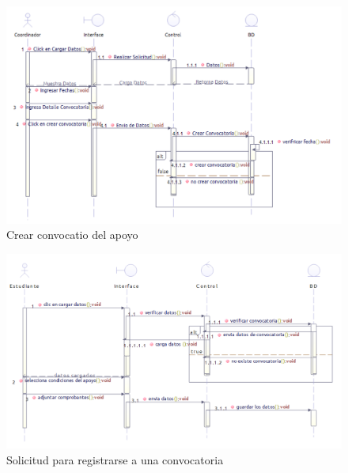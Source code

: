 	\begin{figure}[th!]
	\centering
	\includegraphics[width=1.4\linewidth]{uml/SecCrearConv}
	\caption{Crear convocatio del apoyo}
	\label{fig:Crear convocatio del apoyo}
	\end{figure}
\clearpage
	\begin{figure}[th!]
	\centering
	\includegraphics[width=1.3\linewidth]{uml/SecSolConv}
	\caption{Solicitud para registrarse a una convocatoria}
	\label{fig:Solicitud para convocatoria}
	\end{figure}

